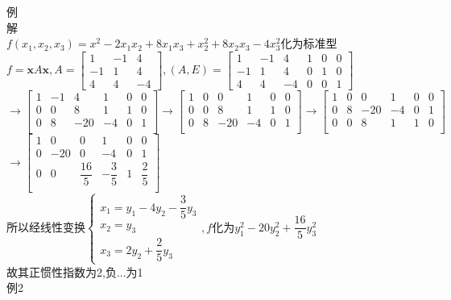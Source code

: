 \documentclass[11pt, a4paper, UTF8]{ctexart}
\begin{document}
\subsubsection{}
例\\
解\\
$f(x_1,x_2,x_3)=x^2-2x_1x_2+8x_1x_3+x_2^2+8x_2x_3-4x_3^2$化为标准型\\
$f=\bm xA\bm x,A=\begin{bmatrix}
1&-1&4\\
-1&1&4\\
4&4&-4
\end{bmatrix},(A,E)=\begin{bmatrix}
1&-1&4&1&0&0\\
-1&1&4&0&1&0\\
4&4&-4&0&0&1
\end{bmatrix}$\\
$\to \begin{bmatrix}
1&-1&4&1&0&0\\
0&0&8&1&1&0\\
0&8&-20&-4&0&1\\
\end{bmatrix}\to \begin{bmatrix}
1&0&0&1&0&0\\
0&0&8&1&1&0\\
0&8&-20&-4&0&1\\
\end{bmatrix}\to \begin{bmatrix}
1&0&0&1&0&0\\
0&8&-20&-4&0&1\\
0&0&8&1&1&0\\
\end{bmatrix}$\\
$\to \begin{bmatrix}
1&0&0&1&0&0\\
0&-20&0&-4&0&1\\
0&0&\dfrac{16}{5}&-\dfrac{3}{5}&1&\dfrac{2}{5}\\
\end{bmatrix}$\\
所以经线性变换$\begin{cases}
x_1=y_1-4y_2-\dfrac{3}{5}y_3\\
x_2=y_3\\
x_3=2y_2+\dfrac{2}{5}y_3
\end{cases},f$化为$y_1^2-20y_2^2+\dfrac{16}{5}y_3^2$\\
故其正惯性指数为2,负...为1\\
例2\\
\end{document}
